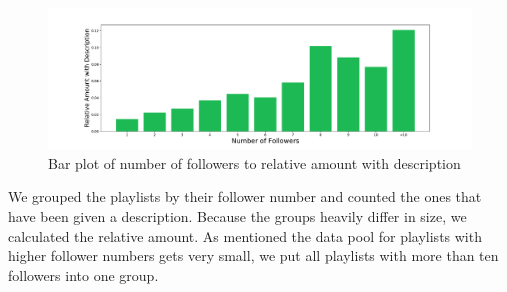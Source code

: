 \begin{figure}[ht]
    \centering
    \includegraphics[width=\textwidth]{fig/followers_to_description.pdf}
    \caption{Bar plot of number of followers to relative amount with description}
    \label{fig:followers_to_description}
\end{figure}

We grouped the playlists by their follower number and counted the ones that have been given a description. Because the groups heavily differ in size, we calculated the relative amount. As mentioned the data pool for playlists with higher follower numbers gets very small, we put all playlists with more than ten followers into one group.